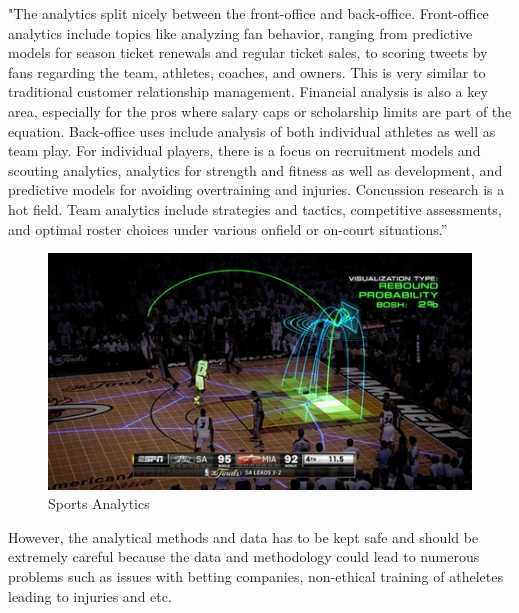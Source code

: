 \documentclass[format=sigconf]{acmart}
\begin{document}
"The analytics split nicely between the front-office and back-office. Front-office analytics
include topics like analyzing fan behavior, ranging from predictive models for season ticket
renewals and regular ticket sales, to scoring tweets by fans regarding the team, athletes,
coaches, and owners. This is very similar to traditional customer relationship management.
Financial analysis is also a key area, especially for the pros where salary caps or scholarship
limits are part of the equation. Back-office uses include analysis of both individual athletes as
well as team play. For individual players, there is a focus on recruitment models and scouting
analytics, analytics for strength and fitness as well as development, and predictive models for
avoiding overtraining and injuries. Concussion research is a hot field. Team analytics include
strategies and tactics, competitive assessments, and optimal roster choices under various onfield or on-court situations.” \cite{tichy2016changing}
\begin{figure}[H]
    \centering
    \includegraphics[scale=0.50]{sportsanalytics.jpg}
    \caption{Sports Analytics}
    \label{fig:sa}
\end{figure}
However, the analytical methods and data has to be kept safe and should be extremely careful because the data and methodology
could lead to numerous problems such as issues with betting companies, non-ethical training of atheletes leading to injuries and 
etc. \cite{spa}


\end{document}
